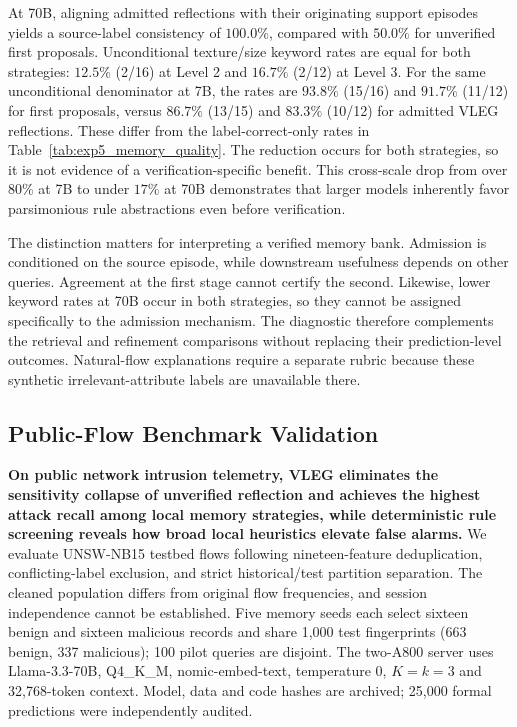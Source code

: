 \documentclass[journal]{IEEEtran}
\theoremstyle{definition}
\theoremstyle{remark}
\begin{document}
At 70B, aligning admitted reflections with their originating support episodes yields a source-label consistency of $100.0\%$, compared with $50.0\%$ for unverified first proposals. Unconditional texture/size keyword rates are equal for both strategies: $12.5\%$ (2/16) at Level 2 and $16.7\%$ (2/12) at Level 3. For the same unconditional denominator at 7B, the rates are $93.8\%$ (15/16) and $91.7\%$ (11/12) for first proposals, versus $86.7\%$ (13/15) and $83.3\%$ (10/12) for admitted VLEG reflections. These differ from the label-correct-only rates in Table~\ref{tab:exp5_memory_quality}. The reduction occurs for both strategies, so it is not evidence of a verification-specific benefit. This cross-scale drop from over $80\%$ at 7B to under $17\%$ at 70B demonstrates that larger models inherently favor parsimonious rule abstractions even before verification.

The distinction matters for interpreting a verified memory bank. Admission is conditioned on the source episode, while downstream usefulness depends on other queries. Agreement at the first stage cannot certify the second. Likewise, lower keyword rates at 70B occur in both strategies, so they cannot be assigned specifically to the admission mechanism. The diagnostic therefore complements the retrieval and refinement comparisons without replacing their prediction-level outcomes. Natural-flow explanations require a separate rubric because these synthetic irrelevant-attribute labels are unavailable there.

\FloatBarrier
\subsection{Public-Flow Benchmark Validation}
\label{sec:exp6}

\textbf{On public network intrusion telemetry, VLEG eliminates the sensitivity collapse of unverified reflection and achieves the highest attack recall among local memory strategies, while deterministic rule screening reveals how broad local heuristics elevate false alarms.} We evaluate UNSW-NB15 testbed flows \cite{moustafa2015unsw} following nineteen-feature deduplication, conflicting-label exclusion, and strict historical/test partition separation. The cleaned population differs from original flow frequencies, and session independence cannot be established. Five memory seeds each select sixteen benign and sixteen malicious records and share 1,000 test fingerprints (663 benign, 337 malicious); 100 pilot queries are disjoint. The two-A800 server uses Llama-3.3-70B, Q4\_K\_M, nomic-embed-text, temperature $0$, $K=k=3$ and 32,768-token context. Model, data and code hashes are archived; 25,000 formal predictions were independently audited.
\end{document}
